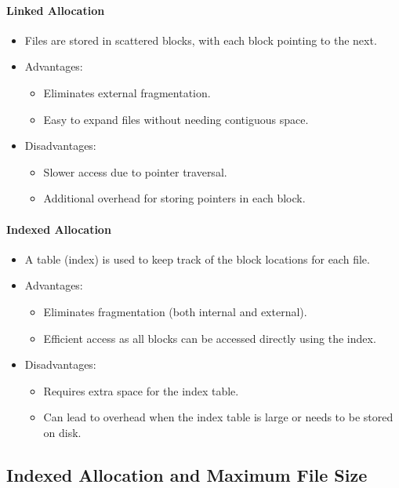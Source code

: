 \paragraph{Linked Allocation}
\begin{itemize}
    \item Files are stored in scattered blocks, with each block pointing to the next.
    \item Advantages:
    \begin{itemize}
        \item Eliminates external fragmentation.
        \item Easy to expand files without needing contiguous space.
    \end{itemize}
    \item Disadvantages:
    \begin{itemize}
        \item Slower access due to pointer traversal.
        \item Additional overhead for storing pointers in each block.
    \end{itemize}
\end{itemize}

\paragraph{Indexed Allocation}
\begin{itemize}
    \item A table (index) is used to keep track of the block locations for each file.
    \item Advantages:
    \begin{itemize}
        \item Eliminates fragmentation (both internal and external).
        \item Efficient access as all blocks can be accessed directly using the index.
    \end{itemize}
    \item Disadvantages:
    \begin{itemize}
        \item Requires extra space for the index table.
        \item Can lead to overhead when the index table is large or needs to be stored on disk.
    \end{itemize}
\end{itemize}


\subsection{Indexed Allocation and Maximum File Size}

